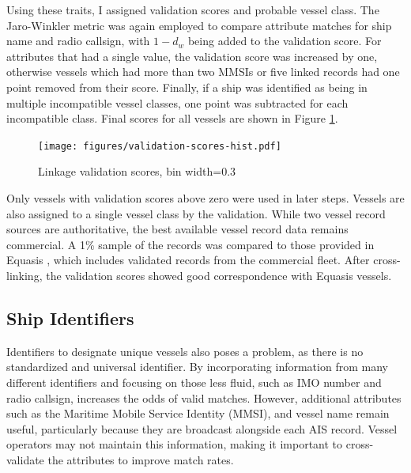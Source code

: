 Using these traits, I assigned validation scores and probable vessel class.  The Jaro-Winkler metric was again employed to compare attribute matches for ship name and radio callsign, with $1 - d_w$ being added to the validation score. For attributes that had a single value, the validation score was increased by one, otherwise vessels which had more than two MMSIs or five linked records had one point removed from their score. Finally, if a ship was identified as being in multiple incompatible vessel classes, one point was subtracted for each incompatible class. Final scores for all vessels are shown in Figure \ref{fig:validation-score-hist}.

\begin{figure}[h!]
  \centering
    \texttt{[image: figures/validation-scores-hist.pdf]}
  \caption[Linkage validation scores]{Linkage validation scores, bin width=0.3}
  \label{fig:validation-score-hist}
\end{figure}

Only vessels with validation scores above zero were used in later steps. Vessels are also assigned to a single vessel class by the validation. While two vessel record sources are authoritative, the best available vessel record data remains commercial. A 1\% sample of the records was compared to those provided in Equasis \citep{Equasis2011}, which includes validated records from the commercial fleet. After cross-linking, the validation scores showed good correspondence with Equasis vessels.

\subsection{Ship Identifiers} 

Identifiers to designate unique vessels also poses a problem, as there is no standardized and universal identifier. By incorporating information from many different identifiers and focusing on those less fluid, such as IMO number and radio callsign, increases the odds of valid matches. However, additional attributes such as the Maritime Mobile Service Identity (MMSI), and vessel name remain useful, particularly because they are broadcast alongside each AIS record. Vessel operators may not maintain this information, making it important to cross-validate the attributes to improve match rates.


